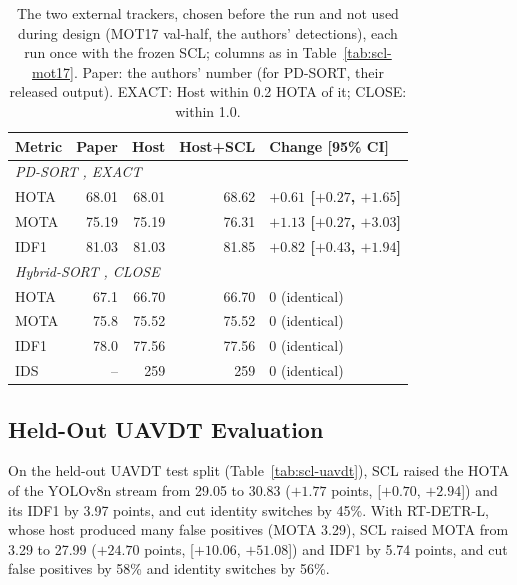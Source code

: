 \begin{table}[tbp]
\centering
\caption{The two external trackers, chosen before the run and not used during design (MOT17 val-half, the authors' detections), each run once with the frozen SCL; columns as in Table~\ref{tab:scl-mot17}. Paper: the authors' number (for PD-SORT, their released output). EXACT: Host within 0.2 HOTA of it; CLOSE: within 1.0.}
\label{tab:scl-external}
\begin{tabular}{lrrrl}
\toprule
Metric & Paper & Host & Host+SCL & Change [95\% CI]\\
\midrule
\multicolumn{5}{l}{\textit{PD-SORT} \cite{wang2025pdsort}\textit{, EXACT}}\\
\quad HOTA & 68.01 & 68.01 & 68.62 & \textbf{$+0.61$ [$+0.27$, $+1.65$]}\\
\quad MOTA & 75.19 & 75.19 & 76.31 & \textbf{$+1.13$ [$+0.27$, $+3.03$]}\\
\quad IDF1 & 81.03 & 81.03 & 81.85 & \textbf{$+0.82$ [$+0.43$, $+1.94$]}\\
\multicolumn{5}{l}{\textit{Hybrid-SORT} \cite{yang2024hybridsort}\textit{, CLOSE}}\\
\quad HOTA & 67.1 & 66.70 & 66.70 & 0 (identical)\\
\quad MOTA & 75.8 & 75.52 & 75.52 & 0 (identical)\\
\quad IDF1 & 78.0 & 77.56 & 77.56 & 0 (identical)\\
\quad IDS & -- & 259 & 259 & 0 (identical)\\
\bottomrule
\end{tabular}
\end{table}

\subsection{Held-Out UAVDT Evaluation}\label{sec:scl-res-uavdt}
On the held-out UAVDT test split (Table~\ref{tab:scl-uavdt}), SCL raised the HOTA of the YOLOv8n stream from 29.05 to 30.83 ($+1.77$ points, [$+0.70$, $+2.94$]) and its IDF1 by 3.97 points, and cut identity switches by 45\%. With RT-DETR-L, whose host produced many false positives (MOTA 3.29), SCL raised MOTA from 3.29 to 27.99 ($+24.70$ points, [$+10.06$, $+51.08$]) and IDF1 by 5.74 points, and cut false positives by 58\% and identity switches by 56\%.

